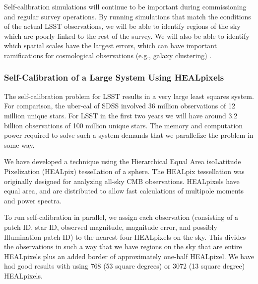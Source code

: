 \documentclass[12pt,preprint]{aastex}
\begin{document}
Self-calibration simulations will continue to be important during commissioning and regular survey operations.  By running simulations that match the conditions of the actual LSST observations, we will be able to identify regions of the sky which are poorly linked to the rest of the survey.  We will also be able to identify which spatial scales have the largest errors, which can have important ramifications for cosmological observations (e.g., galaxy clustering) \citep{Huterer13}. 







\subsubsection{Self-Calibration of a Large System Using HEALpixels}

The self-calibration problem for LSST results in a very large least squares system.  For comparison, the uber-cal of SDSS involved 36 million observations of 12 million unique stars.  For LSST in the first two years we will have around 3.2 billion observations of 100 million unique stars.  The memory and computation power required to solve such a system demands that we parallelize the problem in some way.

We have developed a technique using the Hierarchical Equal Area isoLatitude Pixelization (HEALpix) tessellation of a sphere.  The HEALpix tessellation was originally designed for analyzing all-sky CMB observations.  HEALpixels have equal area, and are distributed to allow fast calculations of multipole moments and power spectra.  

To run self-calibration in parallel, we assign each observation (consisting of a patch ID, star ID, observed magnitude, magnitude error, and possibly Illumination patch ID) to the nearest four HEALpixels on the sky.  This divides the observations in such a way that we have regions on the sky that are entire HEALpixels plus an added border of approximately one-half HEALpixel.  We have had good results with using 768 (53 square degrees) or 3072 (13 square degree) HEALpixels.  
\end{document}
